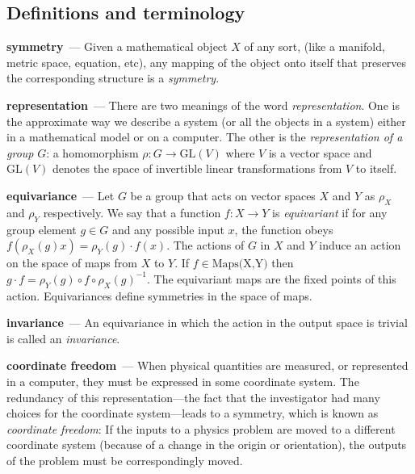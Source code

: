 \documentclass[11pt]{article}
\renewcommand{\paragraph}[1]{\medskip\par\noindent\textbf{#1}~---}
\begin{document}
\subsection*{Definitions and terminology}

\paragraph{symmetry}
Given a mathematical object $X$ of any sort, (like a manifold, metric space, equation, etc), any mapping of the object onto itself that preserves the corresponding structure is a \emph{symmetry}.

\paragraph{representation}
There are two meanings of the word \emph{representation}. One is the approximate way we describe a system (or all the objects in a system) either in a mathematical model or on a computer.
The other is the \emph{representation of a group} $G$: a homomorphism $\rho: G\to \text{GL}(V)$ where $V$ is a vector space and $\text{GL}(V)$ denotes the space of invertible linear transformations from $V$ to itself.

\paragraph{equivariance}
Let $G$ be a group that acts on vector spaces $X$ and $Y$ as $\rho_X$ and $\rho_Y$ respectively. We say that a function $f:X\to Y$ is \emph{equivariant} if for any group element $g\in G$ and any possible input $x$, the function obeys $f( \rho_X(g) x) = \rho_Y(g)\cdot f(x)$.
The actions of $G$ in $X$ and $Y$ induce an action on the space of maps from $X$ to $Y$. If $f\in \text{Maps(X,Y)}$ then $g\cdot f = \rho_Y(g)\circ f \circ \rho_X(g)^{-1}$.
The equivariant maps are the fixed points of this action.
Equivariances define symmetries in the space of maps. 

\paragraph{invariance}
An equivariance in which the action in the output space is trivial is called an \emph{invariance}.

\paragraph{coordinate freedom}
When physical quantities are measured, or represented in a computer, they must be expressed in some coordinate system.
The redundancy of this representation---the fact that the investigator had many choices for the coordinate system---leads to a symmetry, which is known as \emph{coordinate freedom}:
If the inputs to a physics problem are moved to a different coordinate system (because of a change in the origin or orientation), the outputs of the problem must be correspondingly moved.
\end{document}
